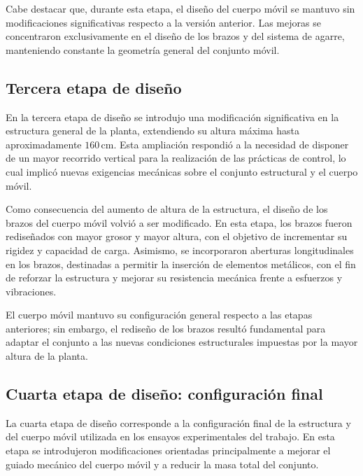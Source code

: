 Cabe destacar que, durante esta etapa, el diseño del cuerpo móvil se mantuvo sin modificaciones significativas respecto a la versión anterior. Las mejoras se concentraron exclusivamente en el diseño de los brazos y del sistema de agarre, manteniendo constante la geometría general del conjunto móvil.



\subsection{Tercera etapa de diseño}

En la tercera etapa de diseño se introdujo una modificación significativa en la estructura general de la planta, extendiendo su altura máxima hasta aproximadamente \(160\,\text{cm}\). Esta ampliación respondió a la necesidad de disponer de un mayor recorrido vertical para la realización de las prácticas de control, lo cual implicó nuevas exigencias mecánicas sobre el conjunto estructural y el cuerpo móvil.

Como consecuencia del aumento de altura de la estructura, el diseño de los brazos del cuerpo móvil volvió a ser modificado. En esta etapa, los brazos fueron rediseñados con mayor grosor y mayor altura, con el objetivo de incrementar su rigidez y capacidad de carga. Asimismo, se incorporaron aberturas longitudinales en los brazos, destinadas a permitir la inserción de elementos metálicos, con el fin de reforzar la estructura y mejorar su resistencia mecánica frente a esfuerzos y vibraciones.

El cuerpo móvil mantuvo su configuración general respecto a las etapas anteriores; sin embargo, el rediseño de los brazos resultó fundamental para adaptar el conjunto a las nuevas condiciones estructurales impuestas por la mayor altura de la planta.


\subsection{Cuarta etapa de diseño: configuración final}

La cuarta etapa de diseño corresponde a la configuración final de la estructura y del cuerpo móvil utilizada en los ensayos experimentales del trabajo. En esta etapa se introdujeron modificaciones orientadas principalmente a mejorar el guiado mecánico del cuerpo móvil y a reducir la masa total del conjunto.

